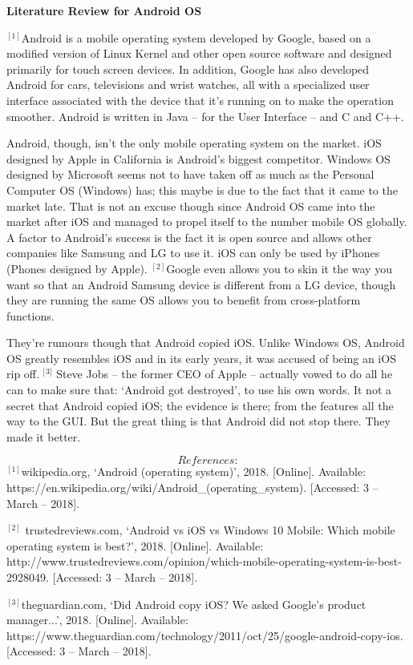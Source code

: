 \documentclass{article} %
\begin{document}


\noindent \textbf{Literature Review for Android OS}

\noindent ${}^{[1] }$Android is a mobile operating system developed by Google, based on a modified version of Linux Kernel and other open source software and designed primarily for touch screen devices. In addition, Google has also developed Android for cars, televisions and wrist watches, all with a specialized user interface associated with the device that it's running on to make the operation smoother. Android is written in Java -- for the User Interface -- and C and C++. 

\noindent Android, though, isn't the only mobile operating system on the market. iOS designed by Apple in California is Android's biggest competitor. Windows OS designed by Microsoft seems not to have taken off as much as the Personal Computer OS (Windows) has; this maybe is due to the fact that it came to the market late. That is not an excuse though since Android OS came into the market after iOS and managed to propel itself to the number mobile OS globally. A factor to Android's success is the fact it is open source and allows other companies like Samsung and LG to use it. iOS can only be used by iPhones (Phones designed by Apple). ${}^{[2] }$Google even allows you to skin it the way you want so that an Android Samsung device is different from a LG device, though they are running the same OS allows you to benefit from cross-platform functions. 

\noindent They're rumours though that Android copied iOS. Unlike Windows OS, Android OS greatly resembles iOS and in its early years, it was accused of being an iOS rip off. ${}^{[}$${}^{3]}$ Steve Jobs -- the former CEO of Apple -- actually vowed to do all he can to make sure that: `Android got destroyed', to use his own words. It not a secret that Android copied iOS; the evidence is there; from the features all the way to the GUI. But the great thing is that Android did not stop there. They made it better. 

\noindent 

\noindent \eject 
\[References:\] 
${}^{[1] }$wikipedia.org, `Android (operating system)', 2018. [Online]. Available: https://en.wikipedia.org/wiki/Android\_(operating\_system). [Accessed: 3 -- March -- 2018].

\noindent ${}^{[2]}$ trustedreviews.com, `Android vs iOS vs Windows 10 Mobile: Which mobile operating system is best?', 2018. [Online]. Available: http://www.trustedreviews.com/opinion/which-mobile-operating-system-is-best-2928049. [Accessed: 3 -- March -- 2018].

\noindent ${}^{[3] }$theguardian.com, `Did Android copy iOS? We asked Google's product manager...', 2018. [Online]. Available: https://www.theguardian.com/technology/2011/oct/25/google-android-copy-ios.  [Accessed: 3 -- March -- 2018].

\noindent \textbf{}
\end{document}
